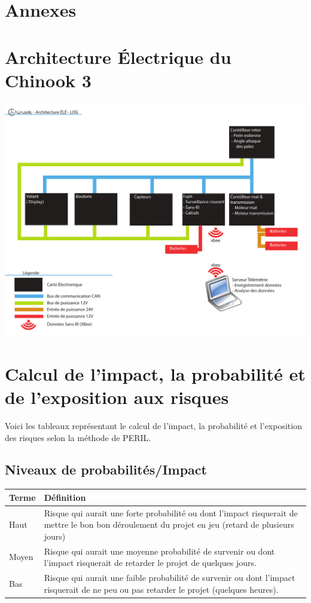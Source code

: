\documentclass[11pt]{article}
\begin{document}
\section*{Annexes}
\begin{appendices}


\section{Architecture Électrique du Chinook 3}
\label{fig:archELE}
\includegraphics[height=1\textwidth,angle=90]{images/Architecture_ÉLÉ-LOG.pdf}

\clearpage
\section{Calcul de l'impact, la probabilité et de l'exposition aux risques}
\label{annexePERIL}
Voici les tableaux représentant le calcul de l'impact, la probabilité et l'exposition des risques selon la méthode de PERIL.

\subsection{Niveaux de probabilités/Impact}


\begin{tabu} to \linewidth {lX}
  Terme & Définition \\
  \hline
  Haut & Risque qui aurait une forte probabilité ou dont l'impact risquerait de mettre le bon bon déroulement du projet en jeu (retard de plusieurs jours) \\
  Moyen & Risque qui aurait une moyenne probabilité de survenir ou dont l'impact risquerait de retarder le projet de quelques jours.\\
  Bas & Risque qui aurait une faible probabilité de survenir ou dont l'impact risquerait de ne peu ou pas retarder le projet (quelques heures). 
\end{tabu}


\end{appendices}
\end{document}
